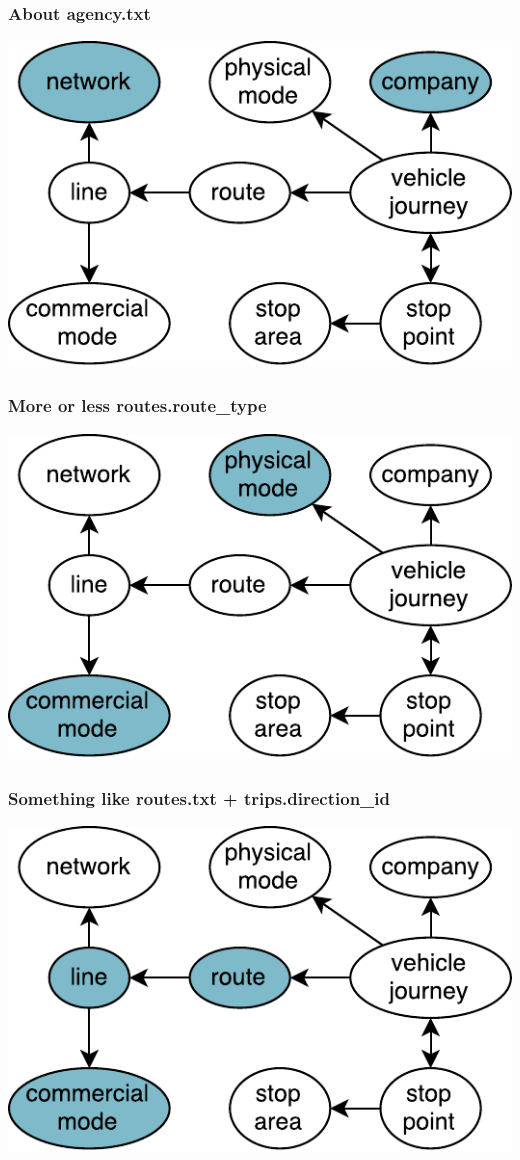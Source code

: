 \documentclass[table]{beamer}
\begin{document}
\begin{frame}
  \frametitle{About agency.txt}

  \centering\includegraphics[width=0.9\linewidth]{images/navitia-model-agency}
\end{frame}

\begin{frame}
  \frametitle{More or less routes.route\_type}

  \centering\includegraphics[width=0.9\linewidth]{images/navitia-model-route-type}
\end{frame}

\begin{frame}
  \frametitle{Something like routes.txt + trips.direction\_id}

  \centering\includegraphics[width=0.9\linewidth]{images/navitia-model-routes}
\end{frame}
\end{document}
